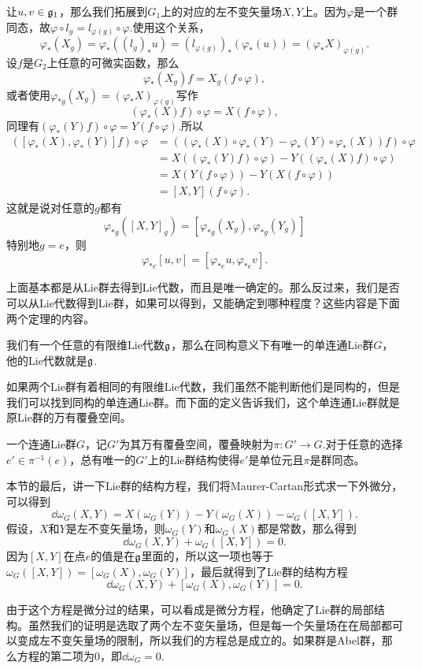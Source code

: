 让$u,v\in{\mathfrak{g}}_1$，那么我们拓展到$G_1$上的对应的左不变矢量场$X,Y$上。因为$\varphi$是一个群同态，故$\varphi\circ l_g=l_{\varphi(g)}\circ \varphi$.使用这个关系，
\[
	\varphi_{*}(X_g)=\varphi_{*}((l_g)_*u)=(l_{\varphi(g)})_*(\varphi_{*}(u))=(\varphi_{*}X)_{\varphi(g)}.
\]
设$f$是$G_2$上任意的可微实函数，那么
\[
\varphi_{*}(X_g)f=X_g(f\circ \varphi),
\]
或者使用$\varphi_{*g}(X_g)=(\varphi_{*}X)_{\varphi(g)}$写作
\[
(\varphi_{*}(X)f)\circ \varphi=X(f\circ \varphi),
\]
同理有$(\varphi_{*}(Y)f)\circ \varphi=Y(f\circ \varphi)$.所以
\[
	\begin{split}
		([\varphi_*(X),\varphi_*(Y)]f)\circ \varphi&=((\varphi_*(X)\circ\varphi_*(Y)-\varphi_*(Y)\circ\varphi_*(X))f)\circ \varphi\\
		&=X((\varphi_*(Y)f)\circ \varphi)-Y((\varphi_*(X)f)\circ \varphi)\\
		&=X(Y(f\circ \varphi))-Y(X(f\circ \varphi))\\
		&=[X,Y](f\circ \varphi).
	\end{split}
\]
这就是说对任意的$g$都有
\[
	\varphi_{*g}([X,Y]_g)=[\varphi_{*g}(X_g),\varphi_{*g}(Y_g)]
\]
特别地$g=e$，则
\[
	\varphi_{*e}[u,v]=[\varphi_{*e}u,\varphi_{*e}v].
\]

上面基本都是从Lie群去得到Lie代数，而且是唯一确定的。那么反过来，我们是否可以从Lie代数得到Lie群，如果可以得到，又能确定到哪种程度？这些内容是下面两个定理的内容。

\theo 我们有一个任意的有限维Lie代数${\mathfrak{g}}$，那么在同构意义下有唯一的单连通Lie群$G$，他的Lie代数就是${\mathfrak{g}}$.

如果两个Lie群有着相同的有限维Lie代数，我们虽然不能判断他们是同构的，但是我们可以找到同构的单连通Lie群。而下面的定义告诉我们，这个单连通Lie群就是原Lie群的万有覆叠空间。

\theo 一个连通Lie群$G$，记$G'$为其万有覆叠空间，覆叠映射为$\pi:G'\to G$.对于任意的选择$e'\in \pi^{−1}(e)$，总有唯一的$G'$上的Lie群结构使得$e'$是单位元且$\pi$是群同态。

本节的最后，讲一下Lie群的结构方程，我们将Maurer-Cartan形式求一下外微分，可以得到
\[
\dd \omega_G(X,Y)=X(\omega_G(Y))-Y(\omega_G(X))-\omega_G([X,Y]).
\]
假设，$X$和$Y$是左不变矢量场，则$\omega_G(Y)$和$\omega_G(X)$都是常数，那么得到
\[
\dd \omega_G(X,Y)+\omega_G([X,Y])=0.
\]
因为$[X,Y]$在点$e$的值是在${\mathfrak{g}}$里面的，所以这一项也等于$\omega_G([X,Y])=[\omega_G(X),\omega_G(Y)]$，最后就得到了Lie群的结构方程
\[
\dd \omega_G(X,Y)+[\omega_G(X),\omega_G(Y)]=0.
\]

由于这个方程是微分过的结果，可以看成是微分方程，他确定了Lie群的局部结构。虽然我们的证明是选取了两个左不变矢量场，但是每一个矢量场在在局部都可以变成左不变矢量场的限制，所以我们的方程总是成立的。如果群是Abel群，那么方程的第二项为0，即$\dd \omega_G=0$.


